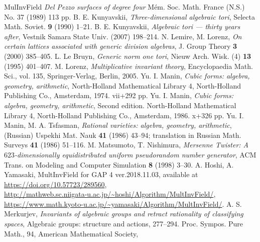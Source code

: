 \documentclass{amsart}
\theoremstyle{plain}
\theoremstyle{definition}
\theoremstyle{remark}
\begin{document}
{\begin{thebibliography}{MulInvField}
{\it Del Pezzo surfaces of degree four} 
M\'em. Soc. Math. France (N.S.) No. 37 (1989) 113 pp. 
B. E. Kunyavskii, 
{\it Three-dimensional algebraic tori},
Selecta Math. Soviet. \textbf{9} (1990) 1--21.
 B. E. Kunyavskii, 
{\it Algebraic tori --- thirty years after}, 
Vestnik Samara State Univ. (2007) 198--214. 
N. Lemire, M. Lorenz, 
{\it On certain lattices associated with generic division algebras}, 
J. Group Theory \textbf{3} (2000) 385--405.
L. Le Bruyn, 
{\it Generic norm one tori},
Nieuw Arch. Wisk. (4) \textbf{13} (1995) 401--407. 
M. Lorenz, 
{\it Multiplicative invariant theory}, 
Encyclopaedia Math. Sci., vol. 135, Springer-Verlag, Berlin, 2005. 
Yu. I. Manin, 
{\it Cubic forms: algebra, geometry, arithmetic}, 
North-Holland Mathematical Library 4, North-Holland Publishing Co., 
Amsterdam, 1974. vii+292 pp.
Yu. I. Manin, 
{\it Cubic forms: algebra, geometry, arithmetic},  
Second edition. North-Holland Mathematical Library 4, 
North-Holland Publishing Co., Amsterdam, 1986. x+326 pp.
Yu. I. Manin, M. A. Tsfasman, 
{\it Rational varieties: algebra, geometry, arithmetic}, (Russian)
Uspekhi Mat. Nauk \textbf{41} (1986) 43--94; 
translation in Russian Math. Surveys \textbf{41} (1986) 51--116. 
M. Matsumoto, T. Nishimura, 
{\it Mersenne Twister: A $623$-dimensionally equidistributed uniform 
pseudorandom number generator}, 
ACM Trans. on Modeling and Computer Simulation \textbf{8} (1998) 3--30. 
A. Hoshi, A. Yamasaki, 
MultInvField for GAP 4 ver.2018.11.03, 
available at \url{https://doi.org/10.57723/289560},\\ 
\url{http://mathweb.sc.niigata-u.ac.jp/~hoshi/Algorithm/MultInvField/},\\ 
\url{https://www.math.kyoto-u.ac.jp/~yamasaki/Algorithm/MultInvField/}. 
A. S. Merkurjev, 
{\it Invariants of algebraic groups and retract rationality of 
classifying spaces}, 
Algebraic groups: structure and actions, 277--294. 
Proc. Sympos. Pure Math., 94, American Mathematical Society, 

\end{thebibliography}}
\end{document}
